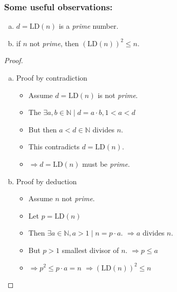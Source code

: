 \begin{frame}
  \frametitle{Some useful observations:}
  \begin{theorem}
    \begin{enumerate}[a)]
      \item $d = \mbox{LD}(n)$ is a \emph{prime} number.
      \item if $n$ not \emph{prime}, then $(\mbox{LD}(n))^2 \le n$.
    \end{enumerate}
  \end{theorem}
  \begin{proof}
    \begin{enumerate}[a)]
      \item Proof by contradiction
        \begin{itemize}
	      \item Assume $d = \mbox{LD}(n)$ is not \emph{prime}.
	      \item The $\exists a,b \in \mathbb{N} \mid d = a \cdot b, 1<a<d$
	      \item But then $a<d \in \mathbb{N}$ divides $n$.
	      \item This contradicts  $d = \mbox{LD}(n)$.
	      \item $\Rightarrow d = \mbox{LD}(n)$ must be \emph{prime}.
	    \end{itemize}
	  \item Proof by deduction
	    \begin{itemize}
	      \item Assume $n$ not \emph{prime}.
	      \item Let $p = \mbox{LD}(n)$
	      \item Then $\exists a \in \mathbb{N}, a>1 \mid n = p \cdot a$. $\Rightarrow a$ divides $n$.
	      \item But $p>1$ smallest divisor of $n$. $\Rightarrow p\le a$
	      \item $\Rightarrow p^2 \le p \cdot a = n$ $\Rightarrow (\mbox{LD}(n))^2 \le n$
	    \end{itemize}  
    \end{enumerate}
  \end{proof}
\end{frame}